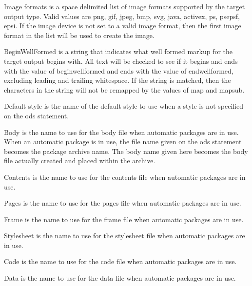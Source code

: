 \begin{description}
Image formats is a space delimited list of image formats supported by the target output
type.  Valid values are png, gif, jpeg, bmp, svg, java, activex, ps, psepsf, epsi.
If the image device is not set to a valid image format, then the first image format
in the list will be used to create the image.


BeginWellFormed is a string that indicates what well formed markup for the target
output begins with.  All text will be checked to see if it begins and ends with
the value of beginwellformed and ends with the value of endwellformed, excluding
leading and trailing whitespace.  If the string is matched, then the characters
in the string will not be remapped by the values of map and mapsub.



Default style is the name of the default style to use when a style is not
specified on the ods statement.


Body is the name to use for the body file when automatic packages are in use.
When an automatic package is in use, the file name given on the ods statement
becomes the package archive name.  The body name given here becomes the body
file actually created and placed within the archive.


Contents is the name to use for the contents file when automatic packages are in use.


Pages is the name to use for the pages file when automatic packages are in use.


Frame is the name to use for the frame file when automatic packages are in use.


Stylesheet is the name to use for the stylesheet file when automatic packages are in use.


Code is the name to use for the code file when automatic packages are in use.


Data is the name to use for the data file when automatic packages are in use.



\end{description}
